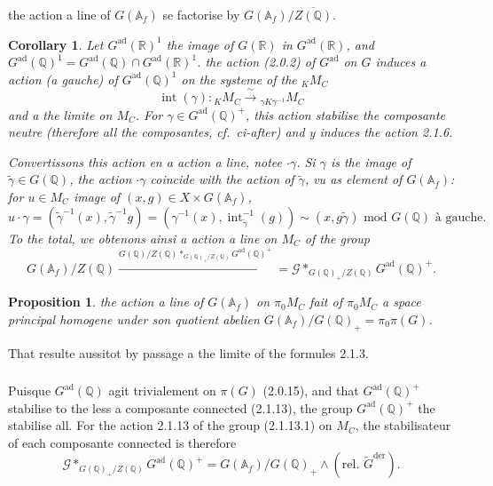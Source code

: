 \documentclass[12pt,a4paper]{article}
\theoremstyle{plain}
\newtheorem{proposition}[theorem]{Proposition}
\newtheorem{corollary}[theorem]{Corollary}
\theoremstyle{definition}
\theoremstyle{remark}
\DeclareMathOperator{\Int}{int}
\newcommand{\QQ}{\mathbb{Q}}
\newcommand{\RR}{\mathbb{R}}
\newcommand{\Af}{\mathbb{A}_f}
\begin{document}
\subsubsection{}

the action a line of $G(\Af)$ se factorise by $G(\Af)/\overline{Z(\QQ)}$.

\begin{corollary}
Let $G^{\text{ad}}(\RR)^1$ the image of $G(\RR)$ in $G^{\text{ad}}(\RR)$, and $G^{\text{ad}}(\QQ)^1 = G^{\text{ad}}(\QQ) \cap G^{\text{ad}}(\RR)^1$. the action (2.0.2) of $G^{\text{ad}}$ on $G$ induces a action (a gauche) of $G^{\text{ad}}(\QQ)^1$ on the systeme of the ${}_K M_C$
\[
\Int(\gamma): {}_K M_C \xrightarrow{\;\sim\;} {}_{\gamma K \gamma^{-1}} M_C
\]
and a the limite on $M_C$. For $\gamma \in G^{\text{ad}}(\QQ)^+$, this action stabilise the composante neutre (therefore all the composantes, cf.~ci-after) and y induces the action 2.1.6.

Convertissons this action en a action a line, notee $\cdot\gamma$. Si $\gamma$ is the image of $\tilde{\gamma} \in G(\QQ)$, the action $\cdot\gamma$ coincide with the action of $\tilde{\gamma}$, vu as element of $G(\Af)$: for $u \in M_C$ image of $(x,g) \in X \times G(\Af)$,
\[
u \cdot \gamma = (\tilde{\gamma}^{-1}(x), \tilde{\gamma}^{-1}g) = (\gamma^{-1}(x), \Int_{\tilde{\gamma}}^{-1}(g)) \sim (x, g\tilde{\gamma}) \text{ mod } G(\QQ) \text{ \`a gauche.}
\]
To the total, we obtenons ainsi a action a line on $M_C$ of the group
\begin{equation}\label{eq:2.1.13.1}
G(\Af)/Z(\QQ) \xrightarrow{G(\QQ)/Z(\QQ) *_{G(\QQ)_+/Z(\QQ)} G^{\text{ad}}(\QQ)^+} = \mathscr{G} *_{G(\QQ)_+/Z(\QQ)} G^{\text{ad}}(\QQ)^+.
\end{equation}
\end{corollary}

\begin{proposition}
the action a line of $G(\Af)$ on $\pi_0 M_C$ fait of $\pi_0 M_C$ a space principal homogene under son quotient abelien $G(\Af)/G(\QQ)_+ = \pi_0\pi(G)$.
\end{proposition}

That resulte aussitot by passage a the limite of the formules 2.1.3.

\subsubsection{}

Puisque $G^{\text{ad}}(\QQ)$ agit trivialement on $\pi(G)$ (2.0.15), and that $G^{\text{ad}}(\QQ)^+$ stabilise to the less a composante connected (2.1.13), the group $G^{\text{ad}}(\QQ)^+$ the stabilise all. For the action 2.1.13 of the group (2.1.13.1) on $M_C$, the stabilisateur of each composante connected is therefore
\begin{equation}\label{eq:2.1.15.1}
\mathscr{G} *_{G(\QQ)_+/Z(\QQ)} G^{\text{ad}}(\QQ)^+ = G(\Af)/G(\QQ)_+\wedge(\text{rel.~}\tilde{G}^{\text{der}}).
\end{equation}
\end{document}
